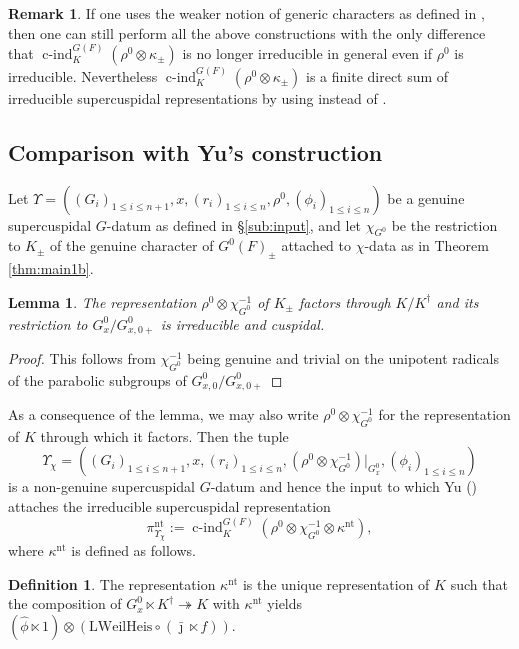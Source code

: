\documentclass{article}
\def\hat{\widehat}
\DeclareMathOperator{\cind}{c-ind}
\newtheorem{lem}[thm]{Lemma}
\theoremstyle{definition}
\newtheorem{rem}[thm]{Remark}
\newtheorem{dfn}[thm]{Definition}
\numberwithin{equation}{subsection}
\renewcommand{\-}{\hyp{}}
\begin{document}
\begin{rem}\label{rem:finitesumofsc}
	If one uses the weaker notion of generic characters as defined in \cite[Definition~4.1.1]{FS25}, then one can still perform all the above constructions with the only difference that $\cind_K^{G(F)}(\rho^0 \otimes \kappa_{\pm})$ is no longer irreducible in general even if $\rho^0$ is irreducible. Nevertheless $\cind_K^{G(F)}(\rho^0 \otimes \kappa_{\pm})$ is a finite direct sum of irreducible supercuspidal representations by using \cite[Theorem~4.6.9.(b)]{FS25} instead of \cite{Fin21Comp, Yu01}.
\end{rem}

\subsection{Comparison with Yu's construction}\label{sub:Yucomparison}
Let \(\Upsilon= ((G_i)_{1\leq i\leq n+1},x,(r_i)_{1\leq i\leq n},\rho^0,(\phi_i)_{1\leq i\leq n}) \) be a genuine supercuspidal $G$-datum as defined in \S\ref{sub:input}, and let $\chi_{G^0}$ be the restriction to $K_{\pm}$ of the genuine character of $G^0(F)_{\pm}$ attached to $\chi$-data as in Theorem \ref{thm:main1b}.

\begin{lem}
	The representation $\rho^0 \otimes \chi_{G^0}^{-1}$  of $K_{\pm}$ factors through $K/K^\dagger$ and its restriction to  $G^0_{x}/G^0_{x,0+}$ is irreducible and cuspidal.
\end{lem}
\begin{proof}
	This follows from $\chi_{G^0}^{-1}$ being genuine and trivial on the unipotent radicals of the parabolic subgroups of $G^0_{x,0}/G^0_{x,0+}$
\end{proof}

As a consequence of the lemma, we may also write $\rho^0 \otimes \chi_{G^0}^{-1}$ for the representation of $K$ through which it factors. Then the tuple 
\[\Upsilon_\chi=((G_i)_{1\leq i\leq n+1},x,(r_i)_{1\leq i\leq n},(\rho^0 \otimes \chi_{G^0}^{-1})|_{G^0_x},(\phi_i)_{1\leq i\leq n}) \] 
is a non-genuine supercuspidal $G$-datum and hence the input to which Yu (\cite{Yu01}) attaches the irreducible supercuspidal representation 
\[\pi_{\Upsilon_\chi}^{\mathrm{nt}}:=\cind_K^{G(F)}( \rho^0 \otimes \chi_{G^0}^{-1} \otimes \kappa^{\mathrm{nt}}) ,\]
 where $\kappa^{\mathrm{nt}}$ is defined as follows.
\begin{dfn}\label{dfn:kappant}
	The representation $\kappa^{\mathrm{nt}}$ is the unique representation of $K$ such that the composition of $G^0_{x} \ltimes K^\dagger \twoheadrightarrow K$ with $\kappa^{\mathrm{nt}}$ yields $(\hat \phi \ltimes 1)\otimes  (\mathrm{LWeilHeis} \circ (\bar\jmath \ltimes f))$. \end{dfn}
\end{document}
